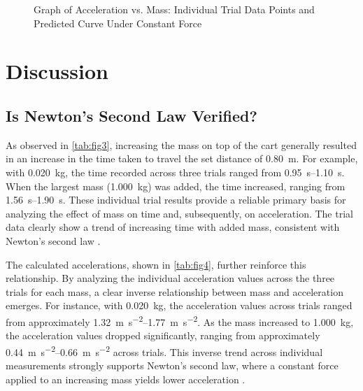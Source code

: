 ﻿\documentclass[reprint,amsmath,amssymb,aps]{revtex4-2}
\begin{document}
\begin{figure}
\begin{center}

\end{center}
\caption{\label{fig:5}Graph of Acceleration vs. Mass: Individual Trial Data Points and Predicted Curve Under Constant Force}
\end{figure}








\section{Discussion}

\subsection{Is Newton’s Second Law Verified?}
As observed in \cref{tab:fig3}, increasing the mass on top of the cart generally resulted in an increase in the time taken to travel the set distance of \qty{0.80}{\meter}. For example, with \qty{0.020}{\kilo\gram}, the time recorded across three trials ranged from \qtyrange{0.95}{1.10}{\second}. When the largest mass (\qty{1.000}{\kilo\gram}) was added, the time increased, ranging from \qtyrange{1.56}{1.90}{\second}. These individual trial results provide a reliable primary basis for analyzing the effect of mass on time and, subsequently, on acceleration. The trial data clearly show a trend of increasing time with added mass, consistent with Newton’s second law \cite{knight2017physics}.

The calculated accelerations, shown in \cref{tab:fig4}, further reinforce this relationship. By analyzing the individual acceleration values across the three trials for each mass, a clear inverse relationship between mass and acceleration emerges. For instance, with \qty{0.020}{\kilo\gram}, the acceleration values across trials ranged from approximately \qtyrange{1.32}{1.77}{\meter\per\second\squared}. As the mass increased to \qty{1.000}{\kilo\gram}, the acceleration values dropped significantly, ranging from approximately \qtyrange{0.44}{0.66}{\meter\per\second\squared} across trials. This inverse trend across individual measurements strongly supports Newton’s second law, where a constant force applied to an increasing mass yields lower acceleration \cite{knight2017physics}. 
\end{document}
